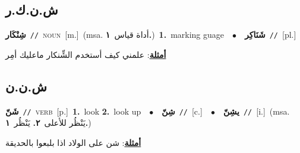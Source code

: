 \documentclass[10pt,a4paper,twoside]{article} %
\begin{document}
\begin{multicols}{2}
\vspace{-3mm}
\subsection*{\color{blue}\foreignlanguage{arabic}{ش.ن.ك.ر}\color{blue}{}} 

{\setlength\topsep{0pt}\textbf{\foreignlanguage{arabic}{شِنْكَار}}\ {\color{gray}\texttt{//}\color{black}}\ \textsc{noun}\ [m.]\ \color{gray}(msa. \foreignlanguage{arabic}{أداة قياس}~\foreignlanguage{arabic}{\textbf{١.}})\color{black}\ \textbf{1.}~marking guage\ \ $\bullet$\ \ \setlength\topsep{0pt}\textbf{\foreignlanguage{arabic}{شَنَاكِر}}\ {\color{gray}\texttt{//}\color{black}}\ [pl.]\  \begin{flushright}\color{gray}\foreignlanguage{arabic}{\textbf{\underline{\foreignlanguage{arabic}{أمثلة}}}: علمني كيف أستخدم الشِّنكار ماعليك أمِر}\end{flushright}\color{black}} \vspace{2mm}

\vspace{-3mm}
\subsection*{\color{blue}\foreignlanguage{arabic}{ش.ن.ن}\color{blue}{}} 

{\setlength\topsep{0pt}\textbf{\foreignlanguage{arabic}{شَنّ}}\ {\color{gray}\texttt{//}\color{black}}\ \textsc{verb}\ [p.]\ \textbf{1.}~look  \textbf{2.}~look up\ \ $\bullet$\ \ \setlength\topsep{0pt}\textbf{\foreignlanguage{arabic}{شِنّ}}\ {\color{gray}\texttt{//}\color{black}}\ [c.]\ \ $\bullet$\ \ \setlength\topsep{0pt}\textbf{\foreignlanguage{arabic}{يشِنّ}}\ {\color{gray}\texttt{//}\color{black}}\ [i.]\ \color{gray}(msa. \foreignlanguage{arabic}{يَنْظُر للأعلى}~\foreignlanguage{arabic}{\textbf{٢.}}  \foreignlanguage{arabic}{يَنْظُر}~\foreignlanguage{arabic}{\textbf{١.}})\color{black}\  \begin{flushright}\color{gray}\foreignlanguage{arabic}{\textbf{\underline{\foreignlanguage{arabic}{أمثلة}}}: شن على الولاد اذا بلبعوا بالحديقة}\end{flushright}\color{black}} \vspace{2mm}


\end{multicols}
\end{document}
